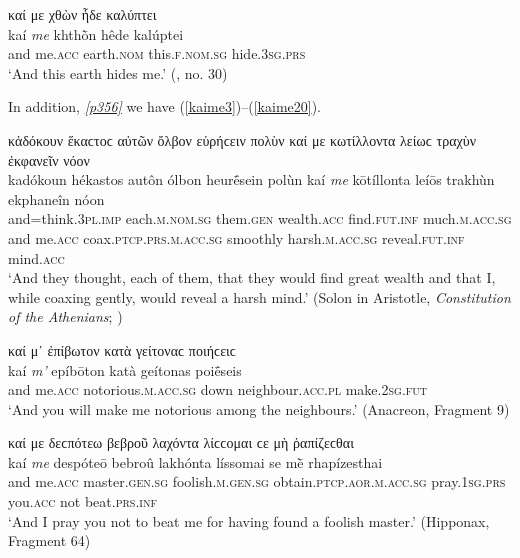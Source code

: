 \begin{exe}
\ex καί με χθὼν ἧδε καλύπτει\\
\gll kaí \emph{me} khthṑn hêde kalúptei\\
and me.\textsc{acc} earth.\textsc{nom} this.\textsc{f.nom.sg} hide.\textsc{3sg.prs}\\
\trans `And this earth hides me.' (\citet{Deecke1884}, no. 30)
\label{kaime2}
\end{exe}

In addition, \hyperlink{p356}{\emph{[p356]}} we have (\ref{kaime3})--(\ref{kaime20}).

\begin{exe}
\ex κἀδόκουν ἕκαϲτοϲ αὐτῶν ὄλβον εὑρήϲειν πολὺν καί με κωτίλλοντα λείωϲ τραχὺν ἐκφανεῖν νόον\\
\gll kadókoun hékastos autôn ólbon heurḗsein polùn kaí \emph{me} kōtíllonta leíōs trakhùn ekphaneîn nóon\\
and=think.\textsc{3pl.imp} each.\textsc{m.nom.sg} them.\textsc{gen} wealth.\textsc{acc} find.\textsc{fut.inf} much.\textsc{m.acc.sg} and me.\textsc{acc} coax.\textsc{ptcp.prs.m.acc.sg} smoothly harsh.\textsc{m.acc.sg} reveal.\textsc{fut.inf} mind.\textsc{acc}\\
\trans `And they thought, each of them, that they would find great wealth and that I, while coaxing gently, would reveal a harsh mind.' (Solon in Aristotle, \textit{Constitution of the Athenians}; \citealp[30, line 1]{Kenyon1891})
\label{kaime3}
\end{exe}

\begin{exe}
\ex καί μ᾽ ἐπίβωτον κατὰ γείτοναϲ ποιήϲειϲ\\
\gll kaí \emph{m'} epíbōton katà geítonas poiḗseis\\
and me.\textsc{acc} notorious.\textsc{m.acc.sg} down neighbour.\textsc{acc.pl} make.\textsc{2sg.fut}\\
\trans `And you will make me notorious among the neighbours.' (Anacreon, Fragment 9)
\label{kaime4}
\end{exe}

\begin{exe}
\ex καί με δεϲπότεω βεβροῦ λαχόντα λίϲϲομαι ϲε μὴ ῥαπίζεϲθαι\\
\gll kaí \emph{me} despóteō bebroû lakhónta líssomai se mḕ rhapízesthai\\
and me.\textsc{acc} master.\textsc{gen.sg} foolish.\textsc{m.gen.sg}
obtain.\textsc{ptcp.aor.m.acc.sg} pray.\textsc{1sg.prs} you.\textsc{acc} not beat.\textsc{prs.inf}\\
\trans `And I pray you not to beat me for having found a foolish master.' (Hipponax, Fragment 64)
\label{kaime5}
\end{exe}

